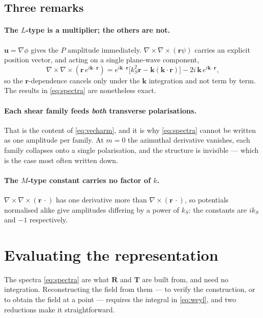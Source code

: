 \documentclass[11pt,a4paper]{article}
\newcommand{\bR}{\mathbf{R}}
\newcommand{\bT}{\mathbf{T}}
\newcommand{\bu}{\mathbf{u}}
\newcommand{\bk}{\mathbf{k}}
\newcommand{\br}{\mathbf{r}}
\begin{document}
\subsection{Three remarks}

\paragraph{The $L$-type is a multiplier; the others are not.}
$\bu = \nabla\phi$ gives the $P$ amplitude immediately.
$\nabla\times\nabla\times(\br\psi)$ carries an explicit position vector, and
acting on a single plane-wave component,
\begin{equation}\label{eq:obstruct}
  \nabla\times\nabla\times\!\left(\br\,e^{i\bk\cdot\br}\right)
   = e^{i\bk\cdot\br}\big[k_S^2\br - \bk(\bk\cdot\br)\big] - 2i\,\bk\,e^{i\bk\cdot\br},
\end{equation}
so the $\br$-dependence cancels only under the $\bk$ integration and not term
by term.  The results in \eqref{eq:spectra} are nonetheless exact.

\paragraph{Each shear family feeds \emph{both} transverse polarisations.}
That is the content of \eqref{eq:vecharm}, and it is why \eqref{eq:spectra}
cannot be written as one amplitude per family.  At $m=0$ the azimuthal
derivative vanishes, each family collapses onto a single polarisation, and the
structure is invisible --- which is the case most often written down.

\paragraph{The $M$-type constant carries no factor of $k$.}
$\nabla\times\nabla\times(\br\,\cdot)$ has one derivative more than
$\nabla\times(\br\,\cdot)$, so potentials normalised alike give amplitudes
differing by a power of $k_S$: the constants are $ik_S$ and $-1$ respectively.

\section{Evaluating the representation}\label{sec:eval}

The spectra \eqref{eq:spectra} are what $\bR$ and $\bT$ are built from, and
need no integration.  Reconstructing the field from them --- to verify the
construction, or to obtain the field at a point --- requires the integral in
\eqref{eq:weyl}, and two reductions make it straightforward.
\end{document}
